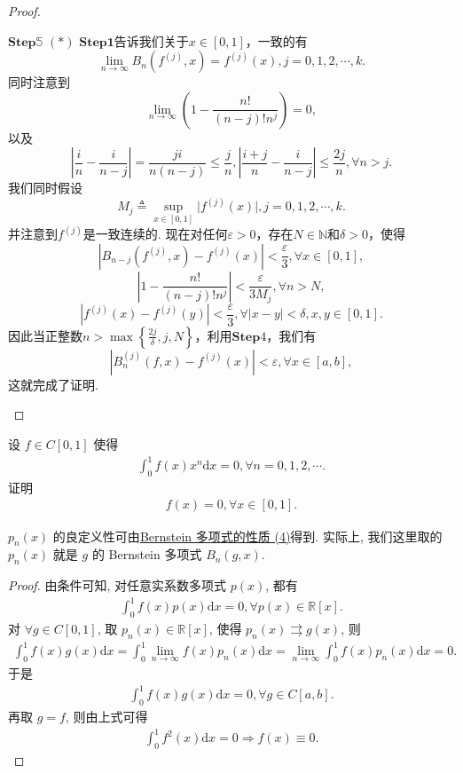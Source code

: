 \documentclass[../../main.tex]{subfiles}%
\begin{document}
\begin{proof}
\begin{enumerate}[(1)]
$\mathbf{Step}\mathbb{5}$ \((*)\) $\mathbf{Step}\mathbf{1}$告诉我们关于\(x\in[0,1]\)，一致的有
\[
\lim_{n\rightarrow\infty}B_n\left(f^{(j)},x\right)=f^{(j)}(x),j = 0,1,2,\cdots,k.
\]
同时注意到
\[
\lim_{n\rightarrow\infty}\left(1-\frac{n!}{(n - j)!n^j}\right)=0,
\]
以及
\[
\left|\frac{i}{n}-\frac{i}{n - j}\right|=\frac{ji}{n(n - j)}\leqslant\frac{j}{n},\left|\frac{i + j}{n}-\frac{i}{n - j}\right|\leqslant\frac{2j}{n},\forall n>j.
\]
我们同时假设
\[
M_j\triangleq\sup_{x\in[0,1]}\vert f^{(j)}(x)\vert,j = 0,1,2,\cdots,k.
\]
并注意到\(f^{(j)}\)是一致连续的.
现在对任何\(\varepsilon>0\)，存在\(N\in\mathbb{N}\)和\(\delta>0\)，使得
\[
\left|B_{n - j}\left(f^{(j)},x\right)-f^{(j)}(x)\right|<\frac{\varepsilon}{3},\forall x\in[0,1],
\]
\[
\left|1-\frac{n!}{(n - j)!n^j}\right|<\frac{\varepsilon}{3M_j},\forall n>N,
\]
\[
\left|f^{(j)}(x)-f^{(j)}(y)\right|<\frac{\varepsilon}{3},\forall\vert x - y\vert<\delta,x,y\in[0,1].
\]
因此当正整数\(n>\max\left\{\frac{2j}{\delta},j,N\right\}\)，利用$\mathbf{Step}4$，我们有
\[
\left|B_n^{(j)}(f,x)-f^{(j)}(x)\right|<\varepsilon,\forall x\in[a,b],
\]
这就完成了证明. 
\end{enumerate}

\end{proof}

\begin{proposition}\label{proposition:x^n与任意连续函数f的积分都为0则f=0}
设 $f \in C[0,1]$ 使得 
\begin{align*}
\int_{0}^{1} f(x)x^{n}\mathrm{d}x = 0, \forall n = 0,1,2,\cdots.
\end{align*}
证明
\begin{align*}
f(x) = 0, \forall x \in [0,1].
\end{align*} 
\end{proposition}
\begin{remark}
$p_n(x)$ 的良定义性可由\hyperref[theorem:Bernstein多项式的性质]{Bernstein 多项式的性质 (4)}得到. 实际上, 我们这里取的 $p_n(x)$ 就是 $g$ 的 Bernstein 多项式 $B_n(g,x)$.
\end{remark}
\begin{proof}

由条件可知, 对任意实系数多项式 $p(x)$, 都有
\begin{align*}
\int_0^1 f(x) p(x) \mathrm{d}x = 0, \forall p(x) \in \mathbb{R}[x].
\end{align*}
对 $\forall g \in C[0,1]$, 取 $p_n(x) \in \mathbb{R}[x]$, 使得 $p_n(x) \rightrightarrows g(x)$, 则
\begin{align*}
\int_0^1 f(x) g(x) \mathrm{d}x = \int_0^1 \lim_{n\rightarrow \infty} f(x) p_n(x) \mathrm{d}x = \lim_{n\rightarrow \infty} \int_0^1 f(x) p_n(x) \mathrm{d}x = 0.
\end{align*}
于是
\begin{align*}
\int_0^1 f(x) g(x) \mathrm{d}x = 0, \forall g \in C[a,b].
\end{align*}
再取 $g = f$, 则由上式可得
\begin{align*}
\int_0^1 f^2(x) \mathrm{d}x = 0 \Rightarrow f(x) \equiv 0.
\end{align*}

\end{proof}
\end{document}
